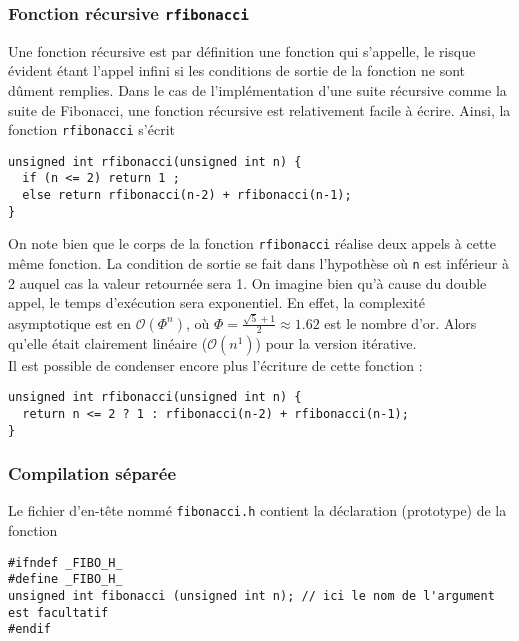 \documentclass{book}
\begin{document}
\begin{correction}
\subsubsection{Fonction récursive \texttt{rfibonacci}}

Une fonction récursive est par définition une fonction qui s'appelle, le risque
évident étant l'appel infini si les conditions de sortie de la fonction ne sont
dûment remplies. Dans le cas de l'implémentation d'une suite récursive comme la
suite de Fibonacci, une fonction récursive est relativement facile à écrire.
Ainsi, la fonction \texttt{rfibonacci} s'écrit

\begin{verbatim}
unsigned int rfibonacci(unsigned int n) {
  if (n <= 2) return 1 ;
  else return rfibonacci(n-2) + rfibonacci(n-1);
}
\end{verbatim}

On note bien que le corps de la fonction \texttt{rfibonacci} réalise deux appels à cette
même fonction. La condition de sortie se fait dans l'hypothèse où \texttt{n} est
inférieur à 2 auquel cas la valeur retournée sera 1. On imagine bien qu'à cause du double appel, le temps d'exécution sera exponentiel. En effet, la complexité asymptotique est en $\mathcal{O}(\Phi^n)$, où $\Phi=\frac{\sqrt{5}+1}{2}\approx 1.62$ est le nombre d'or. Alors qu'elle était clairement linéaire ($\mathcal{O}(n^1)$) pour la version itérative.\\

Il est possible de condenser encore plus l'écriture de cette fonction :

\begin{verbatim}
unsigned int rfibonacci(unsigned int n) {
  return n <= 2 ? 1 : rfibonacci(n-2) + rfibonacci(n-1);
}
\end{verbatim}

\subsubsection{Compilation séparée}


Le fichier d'en-tête nommé \texttt{fibonacci.h} contient la déclaration (prototype) de la fonction

\begin{verbatim}
#ifndef _FIBO_H_
#define _FIBO_H_
unsigned int fibonacci (unsigned int n); // ici le nom de l'argument est facultatif
#endif
\end{verbatim}


\end{correction}
\end{document}
